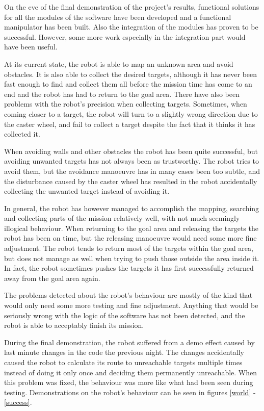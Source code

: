 \documentclass[a4paper,10pt]{article}
\begin{document}
On the eve of the final demonstration of the project's results, functional solutions for all the modules of the software have been developed and a functional manipulator has been built. Also the integration of the modules has proven to be successful. However, some more work especially in the integration part would have been useful.

At its current state, the robot is able to map an unknown area and avoid obstacles. It is also able to collect the desired targets, although it has never been fast enough to find and collect them all before the mission time has come to an end and the robot has had to return to the goal area. There have also been problems with the robot’s precision when collecting targets. Sometimes, when coming closer to a target, the robot will turn to a slightly wrong direction due to the caster wheel, and fail to collect a target despite the fact that it thinks it has collected it.

When avoiding walls and other obstacles the robot has been quite successful, but avoiding unwanted targets has not always been as trustworthy. The robot tries to avoid them, but the avoidance manoeuvre has in many cases been too subtle, and the disturbance caused by the caster wheel has resulted in the robot accidentally collecting the unwanted target instead of avoiding it.

In general, the robot has however managed to accomplish the mapping, searching and collecting parts of the mission relatively well, with not much seemingly illogical behaviour. When returning to the goal area and releasing the targets the robot has been on time, but the releasing manoeuvre would need some more fine adjustment. The robot tends to return most of the targets within the goal area, but does not manage as well when trying to push those outside the area inside it. In fact, the robot sometimes pushes the targets it has first successfully returned away from the goal area again.

The problems detected about the robot's behaviour are mostly of the kind that would only need some more testing and fine adjustment. Anything that would be seriously wrong with the logic of the software has not been detected, and the robot is able to acceptably finish its mission.

During the final demonstration, the robot suffered from a demo effect caused by last minute changes in the code the previous night. The changes accidentally caused the robot to calculate its route to unreachable targets multiple times instead of doing it only once and deciding them permanently unreachable. When this problem was fixed, the behaviour was more like what had been seen during testing. Demonstrations on the robot's behaviour can be seen in figures \ref{world} - \ref{success}.
\end{document}
